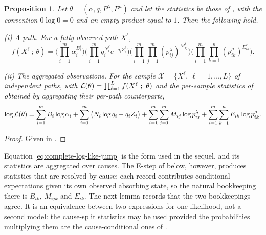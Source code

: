 \documentclass{article}
\newtheorem{proposition}{Proposition}
\newcommand{\X}{{\mathcal{X}}}
\newenvironment{subrevision}{}{}
\newcommand{\subchg}[1]{#1}
\begin{document}
\begin{subrevision}
\begin{proposition}
\label{prop:path-likelihood}
Let $\theta=(\alpha,q,P^\lambda,P^\mu)$ and let the statistics be those of , with the
convention $0\log 0=0$ and an empty product equal to $1$. Then the following hold.

\noindent \textup{(i)} \emph{A path.} For a fully observed path $X^\ell$,
%
\begin{equation}
\label{eq:path-likelihood-general}
f(X^\ell~;~\theta)
=
\Big( \prod_{i=1}^m \alpha_i^{B^\ell_i} \Big)
\Big( \prod_{i=1}^m q_i^{N^\ell_i} e^{-q_i Z^\ell_i} \Big)
\Big( \prod_{i=1}^m \prod_{j=1}^m (p^\lambda_{ij})^{M^\ell_{ij}} \Big)
\Big( \prod_{i=1}^m \prod_{k=1}^n (p^\mu_{ik})^{E^\ell_{ik}} \Big).
\end{equation}

\noindent \textup{(ii)} \emph{The aggregated observations.} For the sample
$\X=\{X^\ell,~\ell=1,\ldots,L\}$ of independent paths, with
${\cal L}(\theta)=\prod_{\ell=1}^L f(X^\ell~;~\theta)$ and the per-sample statistics of
 obtained by aggregating their per-path counterparts,
%
\begin{equation}
\label{eq:complete-log-like-jump}
\log{\cal L}(\theta)
=
\sum_{i=1}^m B_i \log \alpha_i
+ \sum_{i=1}^m \big( N_i \log q_i - q_i Z_i \big)
+ \sum_{i=1}^m \sum_{j=1}^m M_{ij} \log p^\lambda_{ij}
+ \sum_{i=1}^m \sum_{k=1}^n E_{ik} \log p^\mu_{ik}.
\end{equation}
\end{proposition}

\begin{proof}
Given in .
\end{proof}
\end{subrevision}

\subchg{Equation \eqref{eq:complete-log-like-jump} is the form used in the sequel, and its statistics
are aggregated over causes. The E-step of \Cref{sec:em-alg} below, however, produces statistics that are
resolved by cause: each record contributes conditional expectations given its own observed absorbing
state, so the natural bookkeeping there is $B_{ik}$, $M_{ijk}$ and $E_{ik}$. The next lemma records
that the two bookkeepings agree. It is an equivalence between two expressions for one likelihood, not
a second model: the cause-split statistics may be used provided the probabilities multiplying them
are the cause-conditional ones of \Cref{lem:cond-jump-probs}.}
\end{document}
